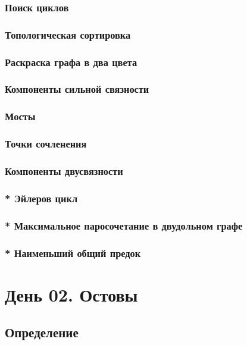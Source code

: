 \documentclass[a4paper,12pt]{article}
\begin{document}
      \subsubsection{Поиск циклов}
      \subsubsection{Топологическая сортировка}
      \subsubsection{Раскраска графа в два цвета}
      \subsubsection{Компоненты сильной связности}
      \subsubsection{Мосты}
      \subsubsection{Точки сочленения}
      \subsubsection{Компоненты двусвязности}
      \subsubsection{* Эйлеров цикл}
      \subsubsection{* Максимальное паросочетание в двудольном графе}
      \subsubsection{* Наименьший общий предок}

  \newpage

  \section{День 02. Остовы}

    \subsection{Определение}
\end{document}
